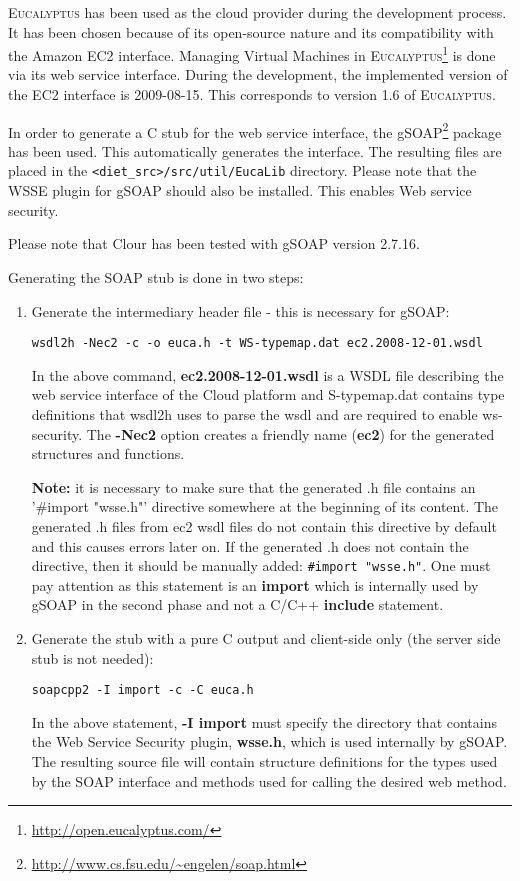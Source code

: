 \textsc{Eucalyptus} has been used as the cloud provider during the development process. It has
been chosen because of its open-source nature and its compatibility with the Amazon EC2 interface.
Managing Virtual Machines in \textsc{Eucalyptus}\footnote{\url{http://open.eucalyptus.com/}}
is done via its web service interface. During
the development, the implemented version of the EC2 interface is 2009-08-15. This corresponds to
version 1.6 of \textsc{Eucalyptus}.

In order to generate a C stub for the web service interface, the gSOAP\footnote{\url{http://www.cs.fsu.edu/~engelen/soap.html}}
package has been used. This automatically generates the interface. The resulting files
are placed in the \verb!<diet_src>/src/util/EucaLib! directory. Please note that the WSSE
plugin for gSOAP should also be installed. This enables Web service security.

Please note that \diet Clour has been tested with gSOAP version 2.7.16.

Generating the SOAP stub is done in two steps:
\begin{enumerate}
\item{Generate the intermediary header file} - this is necessary for gSOAP:

\verb!wsdl2h -Nec2 -c -o euca.h -t WS-typemap.dat ec2.2008-12-01.wsdl!

In the above command, \textbf{ec2.2008-12-01.wsdl} is a WSDL file describing the web service
interface of the Cloud platform and S-typemap.dat contains type definitions that wsdl2h uses
to parse the wsdl and are required to enable ws-security. The \textbf{-Nec2} option creates
a friendly name (\textbf{ec2}) for the generated structures and functions.

\textbf{Note:} it is necessary to make sure that the generated .h file contains an '\#import "wsse.h"'
directive somewhere at the beginning of its content. The generated .h files from ec2 wsdl files do not
contain this directive by default and this causes errors later on. If the generated .h does not contain
the directive, then it should be manually added: \verb!#import "wsse.h"!. One must pay attention as this
statement is an \textbf{import} which is internally used by gSOAP in the second phase and not a C/C++
\textbf{include} statement.
\item{Generate the stub} with a pure C output and client-side only (the server side stub is not needed):

\verb!soapcpp2 -I import -c -C euca.h!

In the above statement, \textbf{-I import} must specify the directory that contains the Web Service Security plugin, \textbf{wsse.h}, which
is used internally by gSOAP. The resulting source file will contain structure definitions for the types
used by the SOAP interface and methods used for calling the desired web method.
\end{enumerate}

